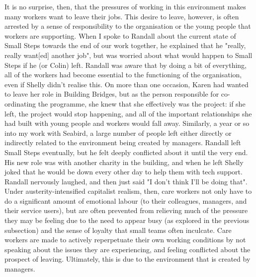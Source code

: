 It is no surprise, then, that the pressures of working in this environment makes many workers want to leave their jobs. This desire to leave, however, is often arrested by a sense of responsibility to the organisation or the young people that workers are supporting. When I spoke to Randall about the current state of Small Steps towards the end of our work together, he explained that he "really, really want[ed] another job", but was worried about what would happen to Small Steps if he (or Colin) left. Randall was aware that by doing a bit of everything, all of the workers had become essential to the functioning of the organisation, even if Shelly didn't realise this. On more than one occasion, Karen had wanted to leave her role in Building Bridges, but as the person responsible for co-ordinating the programme, she knew that she effectively was the project: if she left, the project would stop happening, and all of the important relationships she had built with young people and workers would fall away. Similarly, a year or so into my work with Seabird, a large number of people left either directly or indirectly related to the environment being created by managers. Randall left Small Steps eventually, but he felt deeply conflicted about it until the very end. His new role was with another charity in the building, and when he left Shelly joked that he would be down every other day to help them with tech support. Randall nervously laughed, and then just said "I don’t think I’ll be doing that". Under austerity-intensified capitalist realism, then, care workers not only have to do a significant amount of emotional labour (to their colleagues, managers, and their service users), but are often prevented from relieving much of the pressure they may be feeling due to the need to appear busy (as explored in the previous subsection) and the sense of loyalty that small teams often inculcate. Care workers are made to actively reperpetuate their own working conditions by not speaking about the issues they are experiencing, and feeling conflicted about the prospect of leaving. Ultimately, this is due to the environment that is created by managers.

